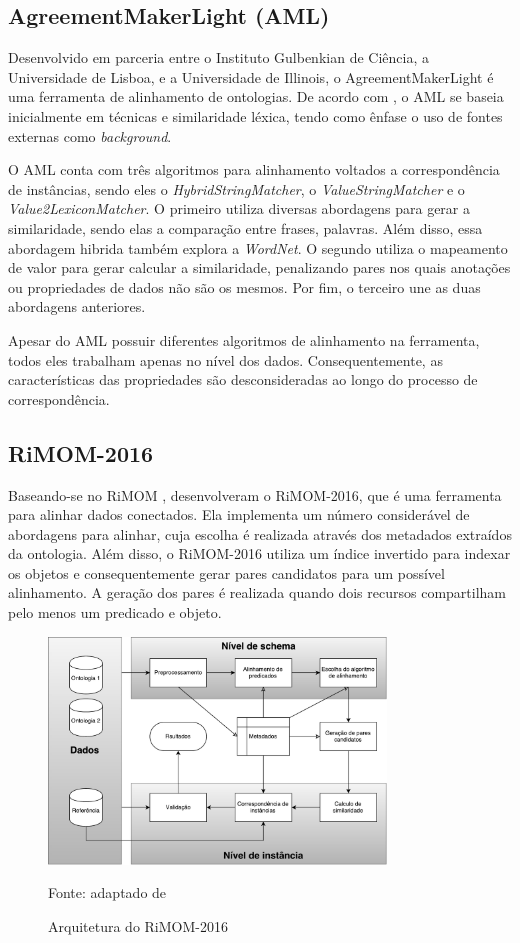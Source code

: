 \subsection{AgreementMakerLight (AML)}
Desenvolvido em parceria entre o Instituto Gulbenkian de Ciência, a Universidade de Lisboa, e a Universidade de Illinois, o AgreementMakerLight é uma ferramenta de alinhamento de ontologias. De acordo com \cite{fariaoaei}, o AML se baseia inicialmente em técnicas e similaridade léxica, tendo como ênfase o uso de fontes externas como \textit{background}.

O AML conta com três algoritmos para alinhamento voltados a correspondência de instâncias, sendo eles o \textit{HybridStringMatcher}, o \textit{ValueStringMatcher} e o \textit{Value2LexiconMatcher}. O primeiro utiliza diversas abordagens para gerar a similaridade, sendo elas a comparação entre frases, palavras. Além disso, essa abordagem hibrida também explora a \textit{WordNet}. O segundo utiliza o mapeamento de valor para gerar calcular a similaridade, penalizando pares nos quais anotações ou propriedades de dados não são os mesmos. Por fim, o terceiro une as duas abordagens anteriores.

Apesar do AML possuir diferentes algoritmos de alinhamento na ferramenta, todos eles trabalham apenas no nível dos dados. Consequentemente, as características das propriedades são desconsideradas ao longo do processo de correspondência.

\subsection{RiMOM-2016}
Baseando-se no RiMOM  \cite{li2009rimom},  desenvolveram o RiMOM-2016, que é uma ferramenta para alinhar dados conectados. Ela implementa um número considerável de abordagens para alinhar, cuja escolha é realizada através dos metadados extraídos da ontologia. Além disso, o RiMOM-2016 utiliza um índice invertido para indexar os objetos e consequentemente gerar pares candidatos para um possível alinhamento. A geração dos pares é realizada quando dois recursos compartilham pelo menos um predicado e objeto.

\begin{figure}[!ht]
	\centering
	\includegraphics[width=0.8\textwidth]{./imagens/rimom_2016.pdf}
    \caption{Arquitetura do RiMOM-2016}
	\footnotesize{Fonte: adaptado de \cite{zhang2016rimom}}
	\label{fig:rimom}
\end{figure}

